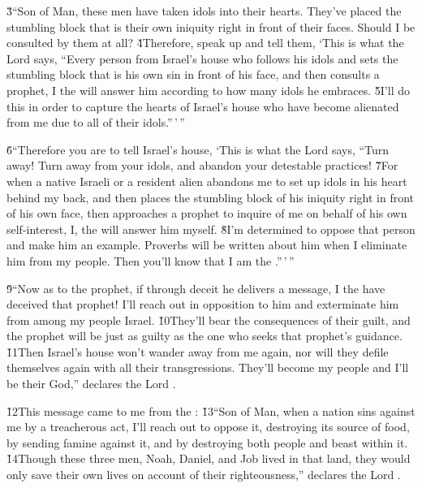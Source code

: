\v{3}``Son of Man, these men have taken idols into their hearts. They've placed the stumbling block that is their own iniquity right in front of their faces. Should I be consulted by them at all? \v{4}Therefore, speak up and tell them, `This is what the Lord  says, ``Every person from Israel's house who follows his idols and sets the stumbling block that is his own sin in front of his face, and then consults a prophet, I the  will answer him according to how many idols he embraces. \v{5}I'll do this in order to capture the hearts of Israel's house who have become alienated from me due to all of their idols.''\,'\,''

\v{6}``Therefore you are to tell Israel's house, `This is what the Lord  says, ``Turn away! Turn away from your idols, and abandon your detestable practices! \v{7}For when a native Israeli or a resident alien abandons me to set up idols in his heart behind my back, and then places the stumbling block of his iniquity right in front of his own face, then approaches a prophet to inquire of me on behalf of his own self-interest, I, the  will answer him myself. \v{8}I'm determined to oppose that person and make him an example. Proverbs will be written about him when I eliminate him from my people. Then you'll know that I am the .''\,'\,''

\v{9}``Now as to the prophet, if through deceit he delivers a message, I the  have deceived that prophet! I'll reach out in opposition to him and exterminate him from among my people Israel. \v{10}They'll bear the consequences of their guilt, and the prophet will be just as guilty as the one who seeks that prophet's guidance. \v{11}Then Israel's house won't wander away from me again, nor will they defile themselves again with all their transgressions. They'll become my people and I'll be their God,'' declares the Lord .

\v{12}This message came to me from the : \v{13}``Son of Man, when a nation sins against me by a treacherous act, I'll reach out to oppose it, destroying its source of food, by sending famine against it, and by destroying both people and beast within it. \v{14}Though these three men, Noah, Daniel, and Job lived in that land, they would only save their own lives on account of their righteousness,'' declares the Lord .

